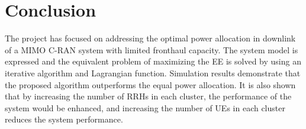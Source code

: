 \documentclass[journal,onecolumn,11pt,draftcls,doublespace]{IEEEtran}
\begin{document}
\section{Conclusion}
The project has focused on addressing the optimal power allocation in downlink of a MIMO C-RAN system with limited fronthaul capacity.
The system model is expressed and the equivalent problem of maximizing the EE is solved by using an iterative algorithm and Lagrangian function.
Simulation results demonstrate that the proposed algorithm outperforms the equal power allocation. It is also shown that by increasing the number of RRHs in each cluster, the performance of the system would be enhanced, and increasing the number of UEs in each cluster reduces the system performance.

\newpage


\
\end{document}
